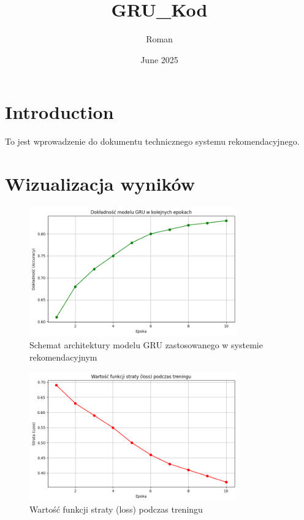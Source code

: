 \documentclass{article}
\title{GRU\_Kod}
\author{Roman}
\date{June 2025}
\begin{document}
\maketitle

\section{Introduction}
To jest wprowadzenie do dokumentu technicznego systemu rekomendacyjnego.

\section{Wizualizacja wyników}

\begin{figure}[H]
\centering
\includegraphics[width=0.8\textwidth]{gru_arch.png}
\caption{Schemat architektury modelu GRU zastosowanego w systemie rekomendacyjnym}
\end{figure}

\begin{figure}[H]
\centering
\includegraphics[width=0.8\textwidth]{loss_plot.png}
\caption{Wartość funkcji straty (loss) podczas treningu}
\end{figure}
\end{document}
